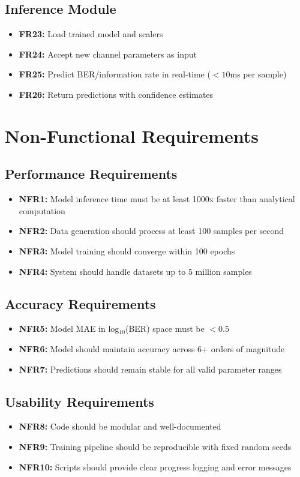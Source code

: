 \documentclass[a4paper,12pt]{report}
\begin{document}
\subsection{Inference Module}
\begin{itemize}
    \item \textbf{FR23:} Load trained model and scalers
    \item \textbf{FR24:} Accept new channel parameters as input
    \item \textbf{FR25:} Predict BER/information rate in real-time ($< 10$ms per sample)
    \item \textbf{FR26:} Return predictions with confidence estimates
\end{itemize}

\section{Non-Functional Requirements}

\subsection{Performance Requirements}
\begin{itemize}
    \item \textbf{NFR1:} Model inference time must be at least 1000x faster than analytical computation
    \item \textbf{NFR2:} Data generation should process at least 100 samples per second
    \item \textbf{NFR3:} Model training should converge within 100 epochs
    \item \textbf{NFR4:} System should handle datasets up to 5 million samples
\end{itemize}

\subsection{Accuracy Requirements}
\begin{itemize}
    \item \textbf{NFR5:} Model MAE in log$_{10}$(BER) space must be $< 0.5$
    \item \textbf{NFR6:} Model should maintain accuracy across 6+ orders of magnitude
    \item \textbf{NFR7:} Predictions should remain stable for all valid parameter ranges
\end{itemize}

\subsection{Usability Requirements}
\begin{itemize}
    \item \textbf{NFR8:} Code should be modular and well-documented
    \item \textbf{NFR9:} Training pipeline should be reproducible with fixed random seeds
    \item \textbf{NFR10:} Scripts should provide clear progress logging and error messages
\end{itemize}
\end{document}
